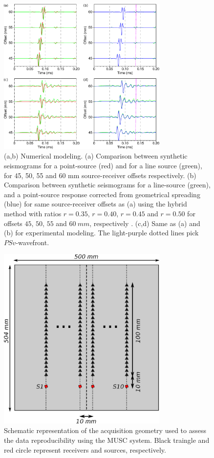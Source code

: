\documentclass[manuscript,revised]{geophysics}
\begin{document}
\begin{figure}[!h]
	\centering
	\includegraphics[width=0.75\textwidth]{fig/trans2d3d.eps}
	\caption{(a,b) Numerical modeling. (a) Comparison between synthetic seismograms for a point-source (red) and for a line source (green), for 45, 50, 55 and 60 mm source-receiver offsets respectively. (b) Comparison between synthetic seismograms for a line-source (green), and a point-source response corrected from geometrical spreading (blue) for same source-receiver offsets as (a) using the hybrid method with ratios $r=0.35$, $r=0.40$, $r=0.45$ and $r=0.50$ for offsets $45$, $50$, $55$ and $60\ mm$, respectively . (c,d) Same as (a) and (b) for experimental modeling. The light-purple dotted lines pick $PSv$-wavefront.}%
	\label{panel_amplitude_sem}
\end{figure}

\begin{figure}[!h]
	\centering
	\includegraphics[width=0.75\textwidth]{fig/reproducibility_acqui_principle.eps}
	\caption{Schematic representation of the acquisition geometry used to assess the data reproducibility using the MUSC system. Black traingle and red circle represent receivers and sources, respectively.}
	\label{reproducibility_acqui_principle}
\end{figure}
\end{document}
